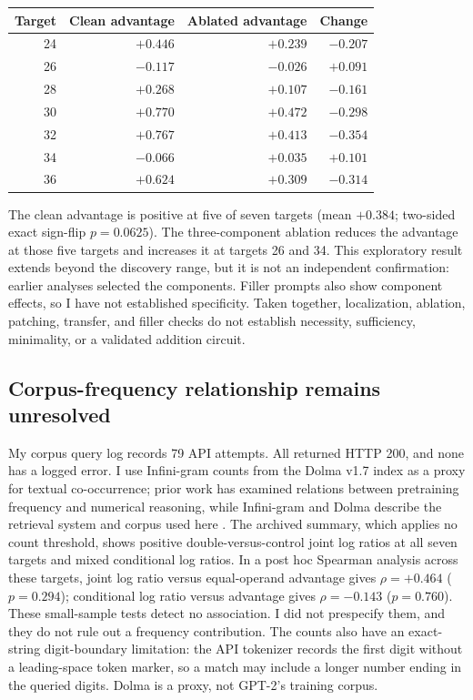 \documentclass[11pt]{article}
\begin{document}
\begin{center}
\small
\begin{tabular}{rrrr}
\toprule
Target & Clean advantage & Ablated advantage & Change \\
\midrule
24 & $+0.446$ & $+0.239$ & $-0.207$ \\
26 & $-0.117$ & $-0.026$ & $+0.091$ \\
28 & $+0.268$ & $+0.107$ & $-0.161$ \\
30 & $+0.770$ & $+0.472$ & $-0.298$ \\
32 & $+0.767$ & $+0.413$ & $-0.354$ \\
34 & $-0.066$ & $+0.035$ & $+0.101$ \\
36 & $+0.624$ & $+0.309$ & $-0.314$ \\
\bottomrule
\end{tabular}
\end{center}

The clean advantage is positive at five of seven targets (mean $+0.384$; two-sided exact sign-flip $p=0.0625$). The three-component ablation reduces the advantage at those five targets and increases it at targets 26 and 34. This exploratory result extends beyond the discovery range, but it is not an independent confirmation: earlier analyses selected the components. Filler prompts also show component effects, so I have not established specificity. Taken together, localization, ablation, patching, transfer, and filler checks do not establish necessity, sufficiency, minimality, or a validated addition circuit.

\subsection{Corpus-frequency relationship remains unresolved}

My corpus query log records 79 API attempts. All returned HTTP 200, and none has a logged error. I use Infini-gram counts from the Dolma v1.7 index as a proxy for textual co-occurrence; prior work has examined relations between pretraining frequency and numerical reasoning, while Infini-gram and Dolma describe the retrieval system and corpus used here \cite{razeghi2022frequency,liu2024infini,soldaini2024dolma}. The archived summary, which applies no count threshold, shows positive double-versus-control joint log ratios at all seven targets and mixed conditional log ratios. In a post hoc Spearman analysis across these targets, joint log ratio versus equal-operand advantage gives $\rho=+0.464$ ($p=0.294$); conditional log ratio versus advantage gives $\rho=-0.143$ ($p=0.760$). These small-sample tests detect no association. I did not prespecify them, and they do not rule out a frequency contribution. The counts also have an exact-string digit-boundary limitation: the API tokenizer records the first digit without a leading-space token marker, so a match may include a longer number ending in the queried digits. Dolma is a proxy, not GPT-2's training corpus.
\end{document}
